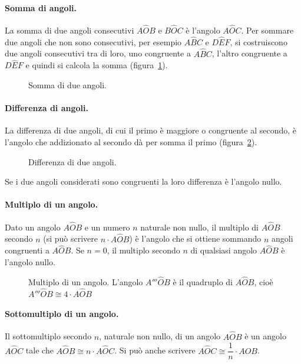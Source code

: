 \paragraph{Somma di angoli.} La somma di due angoli consecutivi $A\widehat{O}B$ e $B\widehat{O}C$ è l'angolo $A\widehat{O}C$. Per sommare due angoli che non sono consecutivi, per esempio $A\widehat{B}C$ e $D\widehat{E}F$, si costruiscono due angoli consecutivi tra di loro, uno congruente a $A\widehat{B}C$, l'altro congruente a $D\widehat{E}F$ e quindi si calcola la somma (figura~\ref{fig:1.32}).

\begin{figure}[htb]
\centering
\caption{Somma di due angoli.}\label{fig:1.32}
\end{figure}

\paragraph{Differenza di angoli.} La differenza di due angoli, di cui il primo è maggiore o congruente al secondo, è l'angolo che addizionato al secondo dà per somma il primo (figura~\ref{fig:1.33}).

\begin{figure}[htb]
\centering
\caption{Differenza di due angoli.}\label{fig:1.33}
\end{figure}

Se i due angoli considerati sono congruenti la loro differenza è l'angolo nullo.

\paragraph{Multiplo di un angolo.} Dato un angolo $A\widehat{O}B$ e un numero $n$ naturale non nullo, il multiplo di $A\widehat{O}B$ secondo $n$ (si può scrivere $n\cdot A\widehat{O}B$) è l'angolo che si ottiene sommando $n$ angoli congruenti a $A\widehat{O}B$. Se $n=0$, il multiplo secondo $n$ di qualsiasi angolo $A\widehat{O}B$ è l'angolo nullo.

\begin{figure}[htb]
\centering
\caption{Multiplo di un angolo. L'angolo $A'''\widehat{O}B$ è il quadruplo di $A\widehat{O}B$, cioè $A'''\widehat{O}B \cong 4\cdot A\widehat{O}B$}
\end{figure}

\paragraph{Sottomultiplo di un angolo.} Il sottomultiplo secondo $n$, naturale non nullo, di un angolo $A\widehat{O}B$ è un angolo $A\widehat{O}C$ tale che $A\widehat{O}B \cong n\cdot A\widehat{O}C$. Si può anche scrivere $A\widehat{O}C\cong \dfrac{1}{n}\cdot A\widehat{O}B$.

